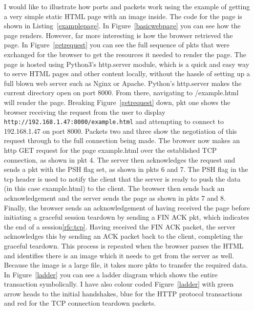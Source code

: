 \documentclass[titlepage]{article}
\begin{document}
I would like to illustrate how ports and packets work using the example of getting a very simple
static HTML page with an image inside.
The code for the page is shown in Listing~\ref{examplepage}.
In Figure~\ref{basicwebpage} you can see how the page renders.
However, far more interesting is how the browser retrieved the page. In Figure~\ref{getrequest}
you can see the full sequence of \glspl{pkt} that were exchanged for the 
browser to get the resources it needed to render the page. The page is hosted using Python3's 
http.server module, which is a quick and easy way to serve HTML pages and other content locally,
without the hassle of setting up a full blown web server such as Nginx or Apache.
Python's http.server makes the current directory open on port 8000\cite{python:httpserver}.
From there, navigating to /example.html will render the page.
Breaking Figure~\ref{getrequest} down, \gls{pkt} one shows the browser receiving the request from the user to 
display \verb|http://192.168.1.47:8000/example.html| and attempting to connect to 192.168.1.47 on 
port 8000. Packets two and three show the negotiation of this request through to the full connection 
being made. The browser now makes an \gls{http} GET request for the page example.html over the 
established TCP connection, as shown in \gls{pkt} 4. The server then acknowledges the request and 
sends a \gls{pkt} with the PSH flag set, as shown in \glspl{pkt} 6 and 7.
The PSH flag in the \gls{tcp} header is used to notify the client that the server is ready to
push the data (in this case example.html) to the client\cite{wiki:tcp}.
The browser then sends back an acknowledgement and the server sends the page as shown in \glspl{pkt} 7 and 8. 
Finally, the browser sends an acknowledgement of having received the page before initiating a 
graceful session teardown by sending a FIN ACK \gls{pkt}, which indicates the end of a session\ref{rfc:tcp}.
Having received the FIN ACK packet, the server acknowledges this by sending an ACK packet back
to the client, completing the graceful teardown.
This process is repeated when the browser parses the HTML and identifies there is an image which it needs to 
get from the server as well. Because the image is a large file, it takes more \glspl{pkt} to
transfer the required data.
In Figure~\ref{ladder} you can see a ladder diagram which shows the entire transaction symbolically.
I have also colour coded Figure~\ref{ladder} with green arrow heads to the initial handshakes,
blue for the HTTP protocol transactions and red for the TCP connection teardown packets.
\end{document}
